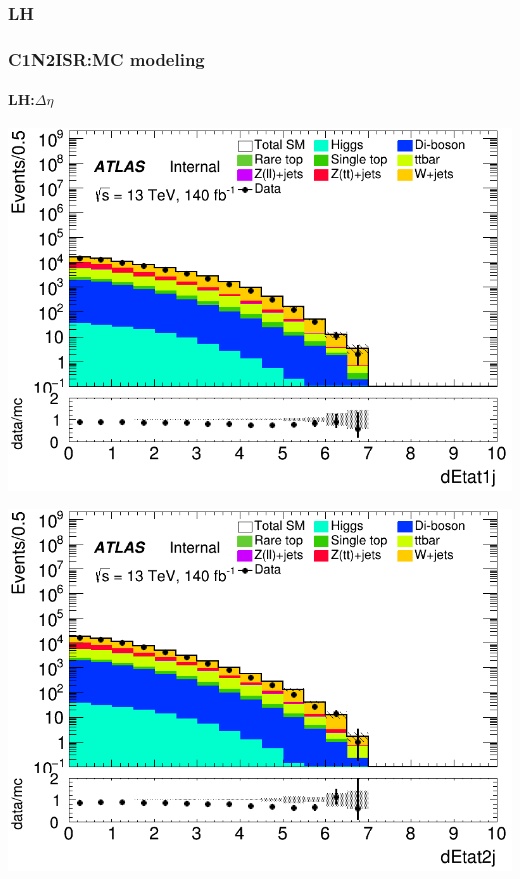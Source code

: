 \documentclass[usenames,dvipsnames]{beamer}
\begin{document}
\subsubsection{LH}
\begin{frame}
\frametitle{C1N2ISR:MC modeling}
\framesubtitle{LH:\quad $\Delta\eta$}
    \begin{minipage}{0.32\textwidth}
        \centering
        \includegraphics[width=\textwidth]{graphics/LH_met/LH_met_dEtat1j.png}
    \end{minipage}
    \hfill
    \begin{minipage}{0.32\textwidth}
        \centering
        \includegraphics[width=\textwidth]{graphics/LH_met/LH_met_dEtat2j.png}
    \end{minipage}
    \hfill
    \begin{minipage}{0.32\textwidth}

\end{minipage}
\end{frame}
\end{document}
